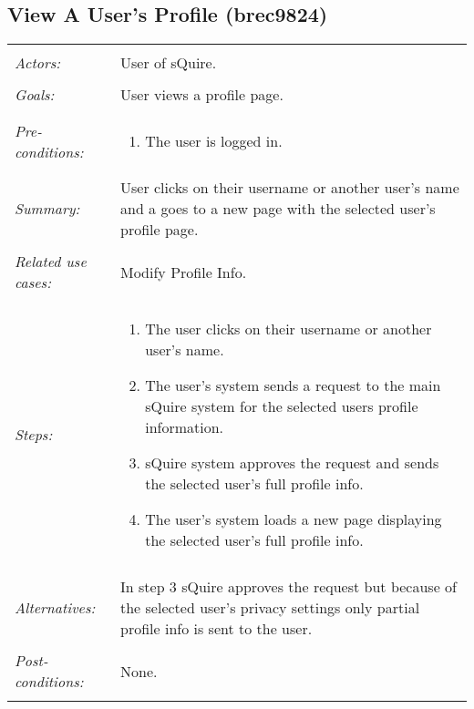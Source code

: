 \documentclass[11pt]{report}
\begin{document}
\subsection{View A User's Profile (brec9824)}
\begin{tabular}{ p{2cm} p{12cm} }
 \hline
 \\
 \textit{Actors:} & User of sQuire. \\ 
 \\
 \textit{Goals:} & User views a profile page. \\
 \\
 \textit{Pre-conditions:} & \begin{enumerate}
  \item The user is logged in.
 \end{enumerate} \\
 \\
 \textit{Summary:} & User clicks on their username or another user's name and a goes to a new page with the selected user's profile page.\\ 
 \\
 \textit{Related use cases:} & Modify Profile Info. \\ 
 \\
 \textit{Steps:} & \begin{enumerate}
  \item The user clicks on their username or another user's name.
  \item The user's system sends a request to the main sQuire system for the selected users profile information.
  \item sQuire system approves the request and sends the selected user's full profile info.
  \item The user's system loads a new page displaying the selected user's full profile info.
 \end{enumerate} \\
 \\
 \textit{Alternatives:} & In step 3 sQuire approves the request but because of the selected user's privacy settings only partial profile info is sent to the user. \\
 \\
 \textit{Post-conditions:} & None. \\
 \\
\hline
\end{tabular}
\end{document}

